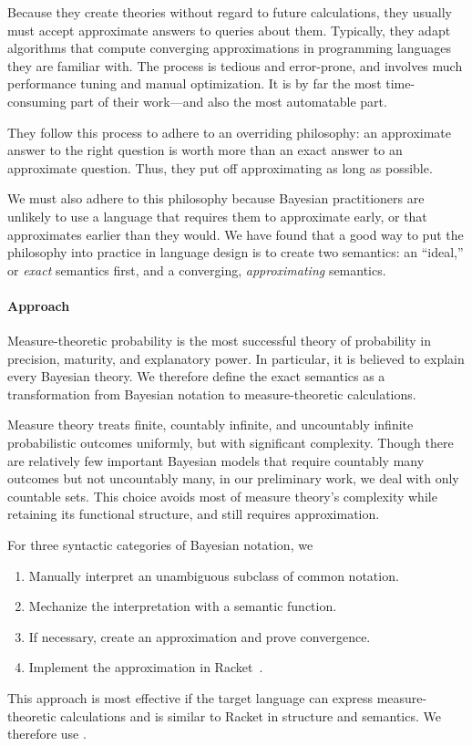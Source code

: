 Because they create theories without regard to future calculations, they usually must accept approximate answers to queries about them. Typically, they adapt algorithms that compute converging approximations in programming languages they are familiar with. The process is tedious and error-prone, and involves much performance tuning and manual optimization. It is by far the most time-consuming part of their work---and also the most automatable part.

They follow this process to adhere to an overriding philosophy: an approximate answer to the right question is worth more than an exact answer to an approximate question. Thus, they put off approximating as long as possible.

We must also adhere to this philosophy because Bayesian practitioners are unlikely to use a language that requires them to approximate early, or that approximates earlier than they would. We have found that a good way to put the philosophy into practice in language design is to create two semantics: an ``ideal,'' or \textit{exact} semantics first, and a converging, \textit{approximating} semantics.

\paragraph{Approach}
Measure-theoretic probability is the most successful theory of probability in precision, maturity, and explanatory power. In particular, it is believed to explain every Bayesian theory. We therefore define the exact semantics as a transformation from Bayesian notation to measure-theoretic calculations.

Measure theory treats finite, countably infinite, and uncountably infinite probabilistic outcomes uniformly, but with significant complexity. Though there are relatively few important Bayesian models that require countably many outcomes but not uncountably many, in our preliminary work, we deal with only countable sets. This choice avoids most of measure theory's complexity while retaining its functional structure, and still requires approximation.

For three syntactic categories of Bayesian notation, we
\begin{enumerate}
	\item Manually interpret an unambiguous subclass of common notation.
	\item Mechanize the interpretation with a semantic function.
	\item If necessary, create an approximation and prove convergence.
	\item Implement the approximation in Racket~\cite{cit:racket-lang}.
\end{enumerate}
This approach is most effective if the target language can express measure-theoretic calculations and is similar to Racket in structure and semantics. We therefore use \targetlang.

